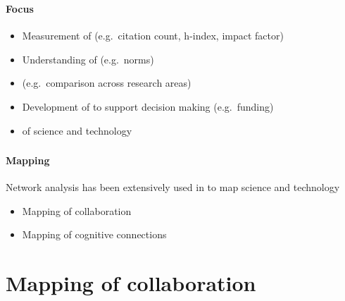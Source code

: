 \documentclass[8pt]{beamer}
\begin{document}
\begin{frame}
\frametitle{\insertsection}
\framesubtitle{Focus}

\begin{itemize}
\item Measurement of {\color{blue}{impact}} (e.g.\ citation count, h-index, impact factor)
\item Understanding of {\color{blue}{citation behavior}} (e.g.\ norms)
\item {\color{blue}{Normalisation}} (e.g.\ comparison across research areas)
\item Development of {\color{blue}{indicators}} to support decision making (e.g.\ funding)
\item {\color{blue}{Mapping}} of science and technology
\end{itemize}

\end{frame}


\begin{frame}
\frametitle{\insertsection}
\framesubtitle{Mapping}


Network analysis has been extensively used in {\color{blue}{bibliometrics/scientometrics}} to map science and technology \cite{Rotolo2015b}

\begin{itemize}
\item Mapping of collaboration
\item Mapping of cognitive connections
\end{itemize}

\end{frame}





\section{Mapping of collaboration}

\bgroup
{}
\begin{frame}[plain]{}
\begin{center}
\color{white}{\Huge\insertsection}
\end{center}
\end{frame}
\egroup
\end{document}
